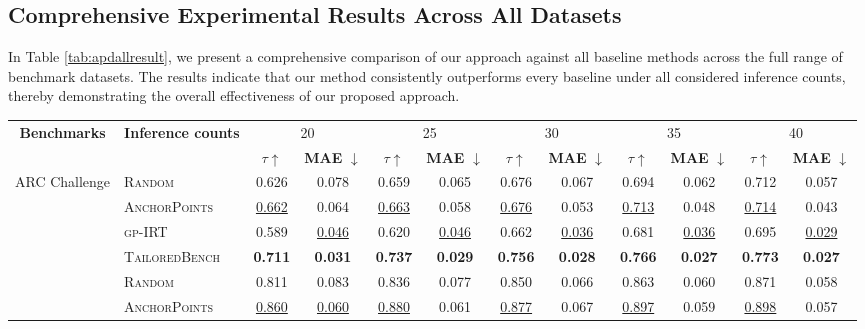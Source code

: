 \subsection{Comprehensive Experimental Results Across All Datasets}
\label{apd:all_result}
In Table \ref{tab:apdallresult}, we present a comprehensive comparison of our approach against all baseline methods across the full range of benchmark datasets. The results indicate that our method consistently outperforms every baseline under all considered inference counts, thereby demonstrating the overall effectiveness of our proposed approach.
\begin{table*}[ht]
\renewcommand\arraystretch{1.2}
\centering
\small
\setlength{\tabcolsep}{0.49em} 
\begin{tabular}{cl*{5}{cc}}
\toprule
\multirow{2}{*}{\textbf{Benchmarks}} & \multirow{2}{*}{\textbf{Inference counts}} & \multicolumn{2}{c}{20} & \multicolumn{2}{c}{25} & \multicolumn{2}{c}{30} & \multicolumn{2}{c}{35} & \multicolumn{2}{c}{40} \\
&  & \textbf{$\tau \uparrow$} & {\scriptsize \textbf{MAE} $\downarrow$}  & \textbf{$\tau \uparrow$} & {\scriptsize \textbf{MAE} $\downarrow$}  & \textbf{$\tau \uparrow$} & {\scriptsize \textbf{MAE} $\downarrow$}  & \textbf{$\tau \uparrow$} & {\scriptsize \textbf{MAE} $\downarrow$}  & \textbf{$\tau \uparrow$} & {\scriptsize \textbf{MAE} $\downarrow$}  \\
\midrule
\multirow{4}{*}{ARC Challenge}&\textsc{Random}        & 0.626 & 0.078 & 0.659 & 0.065 & 0.676 & 0.067 & 0.694 & 0.062 & 0.712 & 0.057 \\
&\textsc{AnchorPoints} & \uline{0.662} & 0.064 & \uline{0.663} & 0.058 & \uline{0.676} & 0.053 & \uline{0.713} & 0.048 & \uline{0.714} & 0.043 \\
&\textsc{gp-IRT}        & 0.589 & \uline{0.046} & 0.620 & \uline{0.046} & 0.662 & \uline{0.036} & 0.681 & \uline{0.036} & 0.695 & \uline{0.029} \\ 
                           & \textsc{TailoredBench} & \textbf{0.711} & \textbf{0.031} & \textbf{0.737} & \textbf{0.029} & \textbf{0.756} & \textbf{0.028} & \textbf{0.766} & \textbf{0.027} & \textbf{0.773} & \textbf{0.027} \\
\hdashline
\multirow{4}{*}{Hellaswag}&\textsc{Random}         & 0.811 & 0.083 & 0.836 & 0.077 & 0.850 & 0.066 & 0.863 & 0.060 & 0.871 & 0.058  \\
&\textsc{AnchorPoints}  & \uline{0.860} & \uline{0.060} & \uline{0.880} & 0.061 & \uline{0.877} & 0.067 & \uline{0.897} & 0.059 & \uline{0.898} & 0.057 \\

\end{tabular}
\end{table*}
